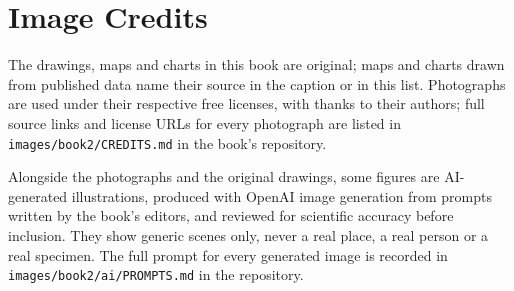 \chapter*{Image Credits}

The drawings, maps and charts in this book are original; maps and charts
drawn from published data name their source in the caption or in this
list. Photographs are used under their respective free licenses, with
thanks to their authors; full source links and license URLs for every
photograph are listed in \texttt{images/book2/CREDITS.md} in the book's
repository.

\bigskip
Alongside the photographs and the original drawings, some figures are
AI-generated illustrations, produced with OpenAI image generation from
prompts written by the book's editors, and reviewed for scientific
accuracy before inclusion. They show generic scenes only, never a real
place, a real person or a real specimen. The full prompt for every
generated image is recorded in \texttt{images/book2/ai/PROMPTS.md} in the
repository.

